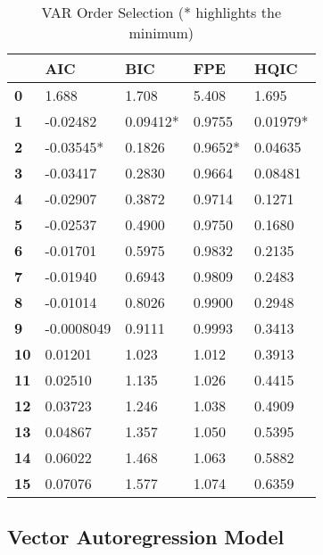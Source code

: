 \documentclass{article}
\begin{document}
\begin{table}
    \centering
    \begin{tabular}{lllll}
      \toprule
        ~ & \textbf{AIC} & \textbf{BIC} & \textbf{FPE} & \textbf{HQIC} \\ \midrule
        \textbf{0}  &       1.688  &       1.708  &       5.408  &        1.695   \\
        \textbf{1}  &    -0.02482  &    0.09412*  &      0.9755  &     0.01979*   \\
        \textbf{2}  &   -0.03545*  &      0.1826  &     0.9652*  &      0.04635   \\
        \textbf{3}  &    -0.03417  &      0.2830  &      0.9664  &      0.08481   \\
        \textbf{4}  &    -0.02907  &      0.3872  &      0.9714  &       0.1271   \\
        \textbf{5}  &    -0.02537  &      0.4900  &      0.9750  &       0.1680   \\
        \textbf{6}  &    -0.01701  &      0.5975  &      0.9832  &       0.2135   \\
        \textbf{7}  &    -0.01940  &      0.6943  &      0.9809  &       0.2483   \\
        \textbf{8}  &    -0.01014  &      0.8026  &      0.9900  &       0.2948   \\
        \textbf{9}  &  -0.0008049  &      0.9111  &      0.9993  &       0.3413   \\
        \textbf{10} &     0.01201  &       1.023  &       1.012  &       0.3913   \\
        \textbf{11} &     0.02510  &       1.135  &       1.026  &       0.4415   \\
        \textbf{12} &     0.03723  &       1.246  &       1.038  &       0.4909   \\
        \textbf{13} &     0.04867  &       1.357  &       1.050  &       0.5395   \\
        \textbf{14} &     0.06022  &       1.468  &       1.063  &       0.5882   \\
        \textbf{15} &     0.07076  &       1.577  &       1.074  &       0.6359   \\ 
        \bottomrule
        \end{tabular}
    \caption{VAR Order Selection (* highlights the minimum)}
    \label{VAROrderSelection}
\end{table}

\hypertarget{vector-autoregression-model}{%
\subsection{Vector Autoregression
Model}\label{vector-autoregression-model}}
\end{document}
